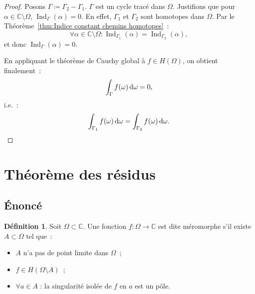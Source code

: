 \documentclass{report}
\theoremstyle{definition}
\newtheorem{déf}[thm]{Définition}
\theoremstyle{remark}
\numberwithin{equation}{section}
\newcommand{\C}{\mathbb C}
\DeclareMathOperator{\Ind}{Ind}
\begin{document}
			\begin{proof} Posons $\Gamma \coloneqq \Gamma_2 - \Gamma_1$. $\Gamma$ est un cycle tracé dans $\Omega$. Justifions que pour $\alpha \in \C \setminus \Omega$,
			$\Ind_\Gamma(\alpha) = 0$. En effet, $\Gamma_1$ et $\Gamma_2$ sont homotopes dans $\Omega$. Par le Théorème~\ref{thm:Indice constant chemins homotopes}~:
			\begin{equation}
				\forall \alpha \in \C \setminus \Omega : \Ind_{\Gamma_1}(\alpha) = \Ind_{\Gamma_2}(\alpha),
			\end{equation}
			et donc $\Ind_\Gamma(\alpha) = 0$.

			En appliquant le théorème de Cauchy global à $f \in H(\Omega)$, on obtient finalement~:\
			\begin{equation}
				\int_\Gamma f(\omega)\dif \omega = 0,
			\end{equation}
			i.e.~:
			\begin{equation}
				\int_{\Gamma_1}f(\omega)\dif \omega = \int_{\Gamma_2}f(\omega)\dif \omega.
			\end{equation}
			\end{proof}

	\section{Théorème des résidus}
		\subsection{Énoncé}
			\begin{déf} Soit $\Omega \subset \C$. Une fonction $f : \Omega \to \C$ est dite méromorphe s'il existe $A \subset \Omega$ tel que~:
			\begin{itemize}
				\item $A$ n'a pas de point limite dans $\Omega$~;
				\item $f \in H(\Omega \setminus A)$~;
				\item $\forall a \in A$ : la singularité isolée de $f$ en $a$ est un pôle.
			\end{itemize}
			\end{déf}
\end{document}
